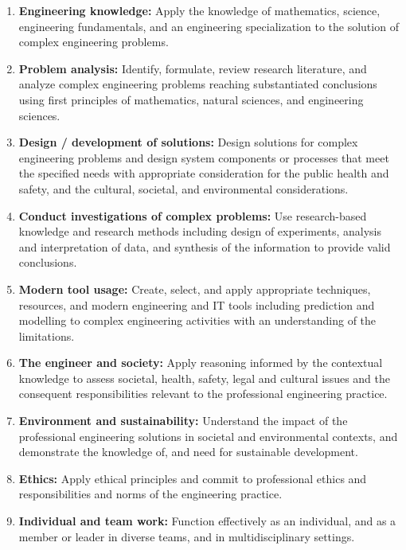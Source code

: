 \documentclass[12pt,a4paper]{report}
\begin{document}
\clearpage
\pagestyle{empty}
\par\vspace{0.2cm}
\begin{enumerate}[leftmargin=*, label=\arabic*.]
    \item \textbf{Engineering knowledge:} Apply the knowledge of mathematics, science, engineering fundamentals, and an engineering specialization to the solution of complex engineering problems.
    \item \textbf{Problem analysis:} Identify, formulate, review research literature, and analyze complex engineering problems reaching substantiated conclusions using first principles of mathematics, natural sciences, and engineering sciences.
    \item \textbf{Design / development of solutions:} Design solutions for complex engineering problems and design system components or processes that meet the specified needs with appropriate consideration for the public health and safety, and the cultural, societal, and environmental considerations.
    \item \textbf{Conduct investigations of complex problems:} Use research-based knowledge and research methods including design of experiments, analysis and interpretation of data, and synthesis of the information to provide valid conclusions.
    \item \textbf{Modern tool usage:} Create, select, and apply appropriate techniques, resources, and modern engineering and IT tools including prediction and modelling to complex engineering activities with an understanding of the limitations.
    \item \textbf{The engineer and society:} Apply reasoning informed by the contextual knowledge to assess societal, health, safety, legal and cultural issues and the consequent responsibilities relevant to the professional engineering practice.
    \item \textbf{Environment and sustainability:} Understand the impact of the professional engineering solutions in societal and environmental contexts, and demonstrate the knowledge of, and need for sustainable development.
    \item \textbf{Ethics:} Apply ethical principles and commit to professional ethics and responsibilities and norms of the engineering practice.
    \item \textbf{Individual and team work:} Function effectively as an individual, and as a member or leader in diverse teams, and in multidisciplinary settings.

\end{enumerate}
\end{document}
